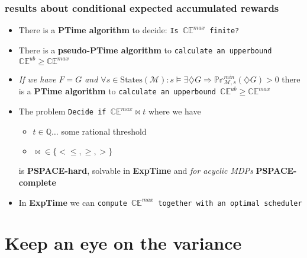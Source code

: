 \documentclass[onlymath]{beamer}
\begin{document}
\begin{frame}
\frametitle{results about conditional expected accumulated rewards}
\begin{itemize}
	\item There is a \textbf{PTime algorithm} to decide: \texttt{Is $\mathbb{CE}^{max}$ finite?}
	\item There is a \textbf{pseudo-PTime algorithm} to \texttt{calculate an upperbound $\mathbb{CE}^{ub} \geq \mathbb{CE}^{max}$}
	\item \textit{If we have $F=G$ and $\forall s \in \mathrm{States}(\mathcal{M}): s \vDash \exists \diamondsuit G \Rightarrow \mathbb{Pr}_{\mathcal{M},s}^{min}(\diamondsuit G) > 0$ } there is a \textbf{PTime algorithm} to \texttt{calculate an upperbound $\mathbb{CE}^{ub} \geq \mathbb{CE}^{max}$}
	\item The problem \texttt{Decide if $\mathbb{CE}^{max} \bowtie t$} where we have
	\begin{itemize}
		\item $t\in \mathbb{Q}\dots$ some rational threshold
		\item $\bowtie \in \{<\leq,\geq,>\}$
	\end{itemize} is \textbf{PSPACE-hard}, solvable in \textbf{ExpTime} and \textit{for acyclic MDPs} \textbf{PSPACE-complete}
	\item In \textbf{ExpTime} we can \texttt{compute $\mathbb{CE}^{max}$ together with an optimal scheduler}
\end{itemize}

\end{frame}


\section{Keep an eye on the variance}
\end{document}
